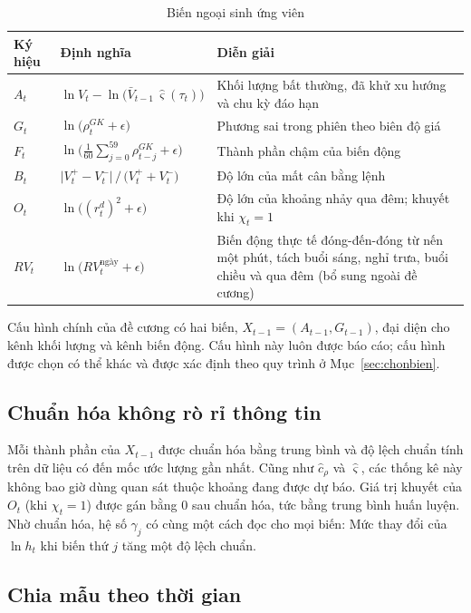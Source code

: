\documentclass[12pt,a4paper]{article}
\theoremstyle{definition}
\theoremstyle{remark}
\begin{document}
\begin{table}[h]
\centering
\caption{Biến ngoại sinh ứng viên}\label{tab:ungvien}
\begin{tabular}{@{}llp{6.4cm}@{}}
\toprule
\textbf{Ký hiệu} & \textbf{Định nghĩa} & \textbf{Diễn giải} \\
\midrule
$A_t$ & $\ln V_t-\ln\big(\bar V_{t-1}\,\hat\varsigma(\tau_t)\big)$ & Khối lượng bất thường, đã khử xu hướng và chu kỳ đáo hạn \\
$G_t$ & $\ln\big(\rho^{GK}_t+\epsilon\big)$ & Phương sai trong phiên theo biên độ giá \\
$F_t$ & $\ln\big(\tfrac{1}{60}\sum_{j=0}^{59}\rho^{GK}_{t-j}+\epsilon\big)$ & Thành phần chậm của biến động \\
$B_t$ & $\big|V^{+}_t-V^{-}_t\big|\,/\,\big(V^{+}_t+V^{-}_t\big)$ & Độ lớn của mất cân bằng lệnh \\
$O_t$ & $\ln\big((r^{d}_t)^2+\epsilon\big)$ & Độ lớn của khoảng nhảy qua đêm; khuyết khi $\chi_t=1$ \\
$RV_t$ & $\ln\big(RV^{\text{ngày}}_t+\epsilon\big)$ & Biến động thực tế đóng-đến-đóng từ nến một phút, tách buổi sáng, nghỉ trưa, buổi chiều và qua đêm (bổ sung ngoài đề cương) \\
\bottomrule
\end{tabular}
\end{table}

Cấu hình chính của đề cương có hai biến, $X_{t-1}=(A_{t-1},G_{t-1})$, đại diện cho kênh khối lượng và kênh biến động. Cấu hình này luôn được báo cáo; cấu hình được chọn có thể khác và được xác định theo quy trình ở Mục~\ref{sec:chonbien}.

\subsection{Chuẩn hóa không rò rỉ thông tin}

Mỗi thành phần của $X_{t-1}$ được chuẩn hóa bằng trung bình và độ lệch chuẩn tính trên dữ liệu có đến mốc ước lượng gần nhất. Cũng như $\hat c_\rho$ và $\hat\varsigma$, các thống kê này không bao giờ dùng quan sát thuộc khoảng đang được dự báo. Giá trị khuyết của $O_t$ (khi $\chi_t=1$) được gán bằng $0$ sau chuẩn hóa, tức bằng trung bình huấn luyện. Nhờ chuẩn hóa, hệ số $\gamma_j$ có cùng một cách đọc cho mọi biến: Mức thay đổi của $\ln h_t$ khi biến thứ $j$ tăng một độ lệch chuẩn.

\subsection{Chia mẫu theo thời gian}\label{sec:chiamau}
\end{document}

